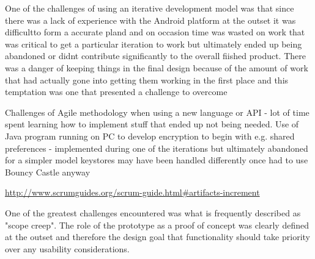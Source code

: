 One of the challenges of using an iterative development model was that since there was a lack of experience with the Android platform at the outset it was difficultto form a accurate pland and on occasion time was wasted on work that was critical to get a particular iteration to work but ultimately ended up being abandoned or didnt contribute significantly to the overall fiished product.  There was a danger of keeping things in the final design because of the amount of work that had actually gone into getting them working in the first place and this temptation was one that presented a challenge to overcome

Challenges of Agile methodology when using a new language or API - lot of time spent learning how to implement stuff that ended up not being needed.
Use of Java program running on PC to develop encryption to begin with
e.g. shared preferences - implemented during one of the iterations but ultimately abandoned for a simpler model
keystores may have been handled differently once had to use Bouncy Castle anyway

\url{http://www.scrumguides.org/scrum-guide.html#artifacts-increment}

One of the greatest challenges encountered was what is frequently described as "scope creep".  The role of the prototype as a proof of concept was clearly defined at the outset and therefore the design goal that functionality should take priority over any usability considerations.  